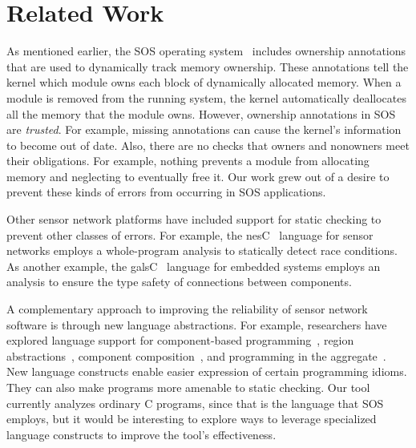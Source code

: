\section{Related Work}
\label{sec:related}




As mentioned earlier, the SOS operating system~\cite{sos} includes
ownership annotations that are used to dynamically track memory
ownership.  These annotations tell the kernel which module owns each
block of dynamically allocated memory.  When a module is removed from
the running system, the kernel automatically deallocates all the
memory that the module owns.  However, ownership annotations in SOS
are {\em trusted}.  For example, missing annotations can cause the
kernel's information to become out of date.  Also, there are no checks
that owners and nonowners meet their obligations.  For example,
nothing prevents a module from allocating memory and neglecting to
eventually free it.  Our work grew out of a desire to prevent these
kinds of errors from occurring in SOS applications.


Other sensor network platforms have included support for static
checking to prevent other classes of errors.  For example, the
nesC~\cite{nesC} language for sensor networks employs a whole-program
analysis to statically detect race conditions.  As another example,
the galsC~\cite{TinyGALS, galsC} language for embedded systems employs
an analysis to ensure the type safety of connections between
components.


A complementary approach to improving the reliability of sensor
network software is through new language abstractions.  For example,
researchers have explored language support for component-based
programming~\cite{TinyOS,nesC,galsC}, region
abstractions~\cite{conf/mobisys/WhitehouseSCB04,conf/nsdi/WelshM04},
component composition~\cite{conf/sensys/GreensteinKE04}, and
programming in the aggregate~\cite{1052213,conf/dcoss/GummadiGG05}.
New language constructs enable easier expression of certain
programming idioms.  They can also make programs more amenable to
static checking.  Our tool currently analyzes ordinary C programs,
since that is the language that SOS employs, but it would be
interesting to explore ways to leverage specialized language
constructs to improve the tool's effectiveness.


